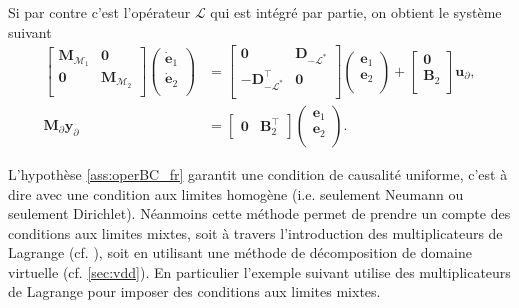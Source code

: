 Si par contre c'est l'opérateur $\mathcal{L}$ qui est intégré par partie, on obtient le système suivant
\begin{equation*}
\begin{aligned}
\begin{bmatrix}
\mathbf{M}_{\mathcal{M}_1} & \mathbf{0} \\
\mathbf{0} & \mathbf{M}_{\mathcal{M}_2} \\
\end{bmatrix}
\begin{pmatrix}
\dot{\mathbf{e}}_{1} \\
\dot{\mathbf{e}}_{2} \\
\end{pmatrix}
&= \begin{bmatrix}
\mathbf{0} & \mathbf{D}_{-\mathcal{L}^*} \\
- \mathbf{D}_{-\mathcal{L}^*}^\top & \mathbf{0} \\
\end{bmatrix} 
\begin{pmatrix}
\mathbf{e}_{1} \\
\mathbf{e}_{2} \\
\end{pmatrix} + 
\begin{bmatrix}
\mathbf{0}\\
\mathbf{B}_2\\
\end{bmatrix}
\mathbf{u}_\partial, \\
\mathbf{M}_\partial {\mathbf{y}_\partial} &= 
\begin{bmatrix}
\mathbf{0} & \mathbf{B}_2^\top 
\end{bmatrix}\begin{pmatrix}
\mathbf{e}_{1} \\
\mathbf{e}_{2} \\
\end{pmatrix}.
\end{aligned}
\end{equation*}

L'hypothèse \ref{ass:operBC_fr} garantit une condition de causalité uniforme, c'est à dire avec une condition aux limites homogène (i.e. seulement Neumann ou seulement Dirichlet). Néanmoins cette méthode permet de prendre un compte des conditions aux limites mixtes, soit à travers l'introduction des multiplicateurs de Lagrange (cf. ), soit en utilisant une méthode de décomposition de domaine virtuelle (cf. \ref{sec:vdd}). En particulier l'exemple suivant utilise des multiplicateurs de Lagrange pour imposer des conditions aux limites mixtes.

